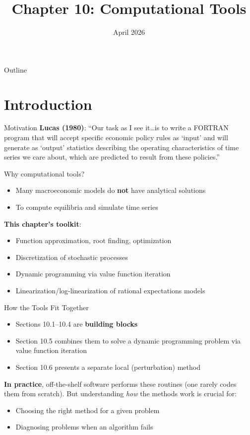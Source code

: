 \documentclass[blue]{beamer}
\title[Chapter10]{Chapter 10: Computational Tools}
\author[]{}
\date[April 2026]{April 2026}
\begin{document}
  \frame
  {
    \titlepage
  }


\begin{frame}{Outline}
	\tableofcontents
\end{frame}
\section{Introduction}

\begin{frame}{Motivation}
	\textbf{Lucas (1980)}: ``Our task as I see it\ldots is to write a FORTRAN program that will accept specific economic policy rules as `input' and will generate as `output' statistics describing the operating characteristics of time series we care about, which are predicted to result from these policies.''

	Why computational tools?
	\begin{itemize}
		\item Many macroeconomic models do \textbf{not} have analytical solutions
		\item To compute equilibria and simulate time series
	\end{itemize}
	\textbf{This chapter's toolkit}:
	\begin{itemize}
		\item Function approximation, root finding, optimization
		\item Discretization of stochastic processes
		\item Dynamic programming via value function iteration
		\item Linearization/log-linearization of rational expectations models
	\end{itemize}
\end{frame}

\begin{frame}{How the Tools Fit Together}
	\begin{itemize}
		\item Sections 10.1--10.4 are \textbf{building blocks}
		\item Section 10.5 combines them to solve a dynamic programming problem via value function iteration
		\item Section 10.6 presents a separate local (perturbation) method
	\end{itemize}
	
	\bigskip
	\textbf{In practice}, off-the-shelf software performs these routines (one rarely codes them from scratch). But understanding \emph{how} the methods work is crucial for:
	\begin{itemize}
		\item Choosing the right method for a given problem
		\item Diagnosing problems when an algorithm fails
	\end{itemize}
	

\end{frame}
\end{document}
